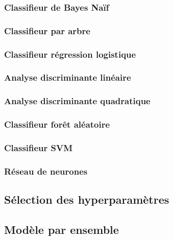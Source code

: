 \subsubsection{Classifieur de Bayes Naïf}

\subsubsection{Classifieur par arbre}

\subsubsection{Classifieur régression logistique}

\subsubsection{Analyse discriminante linéaire}

\subsubsection{Analyse discriminante quadratique}

\subsubsection{Classifieur forêt aléatoire}

\subsubsection{Classifieur SVM}

\subsubsection{Réseau de neurones}

\subsection{Sélection des hyperparamètres}

\subsection{Modèle par ensemble}

